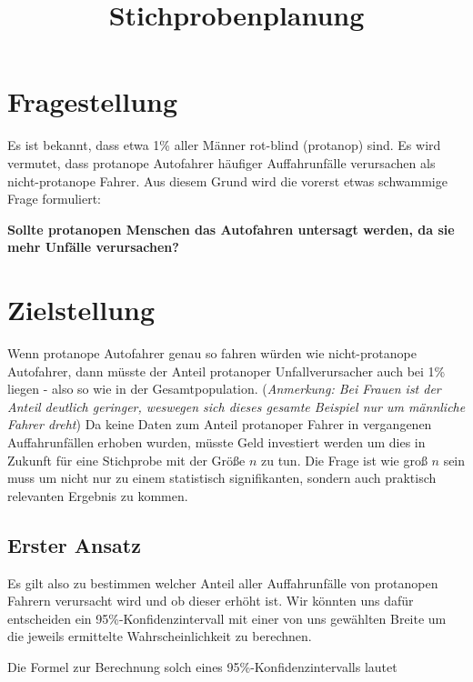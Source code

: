 \documentclass[
]{article}
\title{Stichprobenplanung}
\date{}
\begin{document}
\maketitle

\hypertarget{fragestellung}{%
\section{Fragestellung}\label{fragestellung}}

Es ist bekannt, dass etwa 1\% aller Männer rot-blind (protanop) sind. Es
wird vermutet, dass protanope Autofahrer häufiger Auffahrunfälle
verursachen als nicht-protanope Fahrer. Aus diesem Grund wird die
vorerst etwas schwammige Frage formuliert:

\textbf{Sollte protanopen Menschen das Autofahren untersagt werden, da
sie mehr Unfälle verursachen?}

\hypertarget{zielstellung}{%
\section{Zielstellung}\label{zielstellung}}

Wenn protanope Autofahrer genau so fahren würden wie nicht-protanope
Autofahrer, dann müsste der Anteil protanoper Unfallverursacher auch bei
1\% liegen - also so wie in der Gesamtpopulation. (\emph{Anmerkung: Bei
Frauen ist der Anteil deutlich geringer, weswegen sich dieses gesamte
Beispiel nur um männliche Fahrer dreht}) Da keine Daten zum Anteil
protanoper Fahrer in vergangenen Auffahrunfällen erhoben wurden, müsste
Geld investiert werden um dies in Zukunft für eine Stichprobe mit der
Größe \(n\) zu tun. Die Frage ist wie groß \(n\) sein muss um nicht nur
zu einem statistisch signifikanten, sondern auch praktisch relevanten
Ergebnis zu kommen.

\hypertarget{erster-ansatz}{%
\subsection{Erster Ansatz}\label{erster-ansatz}}

Es gilt also zu bestimmen welcher Anteil aller Auffahrunfälle von
protanopen Fahrern verursacht wird und ob dieser erhöht ist. Wir könnten
uns dafür entscheiden ein 95\%-Konfidenzintervall mit einer von uns
gewählten Breite um die jeweils ermittelte Wahrscheinlichkeit zu
berechnen.

Die Formel zur Berechnung solch eines 95\%-Konfidenzintervalls lautet
\end{document}
